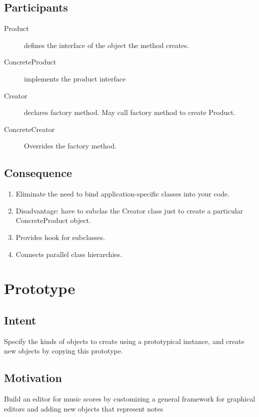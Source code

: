 \documentclass[11pt, a4paper]{book}
\begin{document}
\subsection{Participants}
\begin{description}
\item [Product] defines the interface of the object the method creates.
\item [ConcreteProduct] implements the product interface
\item [Creator] declares factory method. May call factory method to create
Product.
\item [ConcreteCreator] Overrides the factory method.
\end{description}
\subsection{Consequence}
\begin{enumerate}
    \item Eliminate the need to bind application-specific classes into your code.
    \item Disadvantage: have to subclas the Creator class just to create a
    particular ConcreteProduct object.
    \item Provides hook for subclasses.
    \item Connects parallel class hierarchies.
\end{enumerate}
\section{Prototype}
\subsection{Intent}
Specify the kinds of objects to create using a prototypical instance, and create
new objects by copying this prototype.
\subsection{Motivation}
Build an editor for music scores by customizing a general framework for
graphical editors and adding new objects that represent notes
\end{document}
